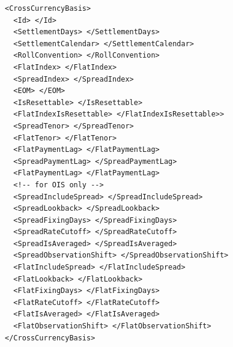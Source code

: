 \begin{listing}[H]
\begin{verbatim}
<CrossCurrencyBasis>
  <Id> </Id>
  <SettlementDays> </SettlementDays>
  <SettlementCalendar> </SettlementCalendar>
  <RollConvention> </RollConvention>
  <FlatIndex> </FlatIndex>
  <SpreadIndex> </SpreadIndex>
  <EOM> </EOM>
  <IsResettable> </IsResettable>
  <FlatIndexIsResettable> </FlatIndexIsResettable>>
  <SpreadTenor> </SpreadTenor>
  <FlatTenor> </FlatTenor>
  <FlatPaymentLag> </FlatPaymentLag>
  <SpreadPaymentLag> </SpreadPaymentLag>
  <FlatPaymentLag> </FlatPaymentLag>
  <!-- for OIS only -->
  <SpreadIncludeSpread> </SpreadIncludeSpread>
  <SpreadLookback> </SpreadLookback>
  <SpreadFixingDays> </SpreadFixingDays>
  <SpreadRateCutoff> </SpreadRateCutoff>
  <SpreadIsAveraged> </SpreadIsAveraged>
  <SpreadObservationShift> </SpreadObservationShift>
  <FlatIncludeSpread> </FlatIncludeSpread>
  <FlatLookback> </FlatLookback>
  <FlatFixingDays> </FlatFixingDays>
  <FlatRateCutoff> </FlatRateCutoff>
  <FlatIsAveraged> </FlatIsAveraged>
  <FlatObservationShift> </FlatObservationShift>
</CrossCurrencyBasis>
\end{verbatim}
\caption{Cross currency basis swap conventions}
\label{lst:xccy_basis_conventions}
\end{listing}


